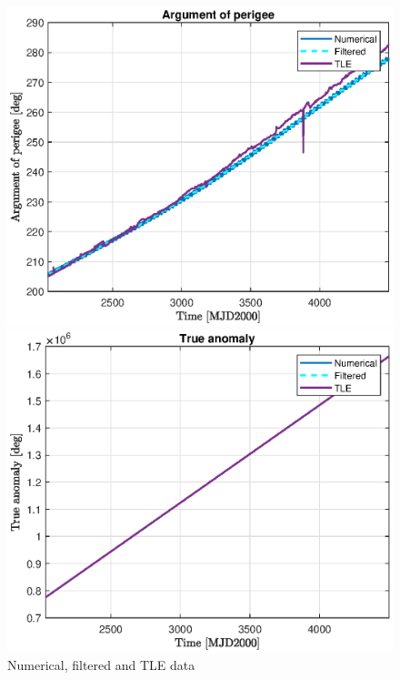 \begin{figure}[H]
\begin{minipage}{0.48\linewidth}
		\centering
		\includegraphics[width=\n\linewidth]{w_TLE.eps}
	\end{minipage}\hfill
	\begin{minipage}{0.48\linewidth}
		\centering
		\includegraphics[width=\n\linewidth]{TA_TLE.eps}
	\end{minipage}
	\caption{Numerical, filtered and TLE data}
	\label{fig:comparison_figures}
\end{figure}